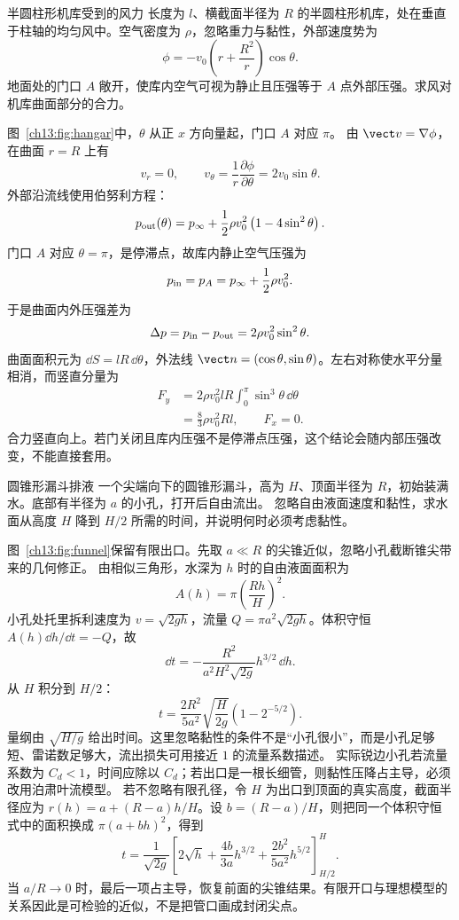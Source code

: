 \begin{origexamplebox}{半圆柱形机库受到的风力}\label{ch13:ex:hangar}
长度为 $l$、横截面半径为 $R$ 的半圆柱形机库，处在垂直于柱轴的均匀风中。空气密度为 $\rho$，忽略重力与黏性，外部速度势为
\[
 \phi=-v_0\left(r+\frac{R^2}{r}\right)\cos\theta .
\]
地面处的门口 $A$ 敞开，使库内空气可视为静止且压强等于 $A$ 点外部压强。求风对机库曲面部分的合力。

\FluidHangarDiagram
\end{origexamplebox}
\begin{xesolution}
图~\ref{ch13:fig:hangar}中，$\theta$ 从正 $x$ 方向量起，门口 $A$ 对应 $\pi$。
由 $\vect v=\nabla\phi$，在曲面 $r=R$ 上有
\[
 v_r=0,\qquad v_\theta=\frac1r\frac{\partial\phi}{\partial\theta}
 =2v_0\sin\theta.
\]
外部沿流线使用伯努利方程：
\[
 p_{\rm out}(\theta)=p_\infty+\frac12\rho v_0^2
 \left(1-4\sin^2\theta\right).
\]
门口 $A$ 对应 $\theta=\pi$，是停滞点，故库内静止空气压强为
\[
 p_{\rm in}=p_A=p_\infty+\frac12\rho v_0^2.
\]
于是曲面内外压强差为
\[
 \Delta p=p_{\rm in}-p_{\rm out}=2\rho v_0^2\sin^2\theta.
\]
曲面面积元为 $\dd S=lR\,\dd\theta$，外法线
$\vect n=(\cos\theta,\sin\theta)$。左右对称使水平分量相消，而竖直分量为
\begin{align*}
 F_y&=2\rho v_0^2lR\int_0^\pi\sin^3\theta\,\dd\theta\\
 &=\boxed{\frac83\rho v_0^2Rl},\qquad F_x=0.
\end{align*}
合力竖直向上。若门关闭且库内压强不是停滞点压强，这个结论会随内部压强改变，不能直接套用。
\end{xesolution}

\begin{origexamplebox}{圆锥形漏斗排液}\label{ch13:ex:funnel}
一个尖端向下的圆锥形漏斗，高为 $H$、顶面半径为 $R$，初始装满水。底部有半径为 $a$ 的小孔，打开后自由流出。
忽略自由液面速度和黏性，求水面从高度 $H$ 降到 $H/2$ 所需的时间，并说明何时必须考虑黏性。

\FluidFunnelDiagram
\end{origexamplebox}
\begin{xesolution}
图~\ref{ch13:fig:funnel}保留有限出口。先取 $a\ll R$ 的尖锥近似，忽略小孔截断锥尖带来的几何修正。
由相似三角形，水深为 $h$ 时的自由液面面积为
\[
 A(h)=\pi\left(\frac{Rh}{H}\right)^2.
\]
小孔处托里拆利速度为 $v=\sqrt{2gh}$，流量
$Q=\pi a^2\sqrt{2gh}$。体积守恒 $A(h)\dd h/\dd t=-Q$，故
\[
 \dd t=-\frac{R^2}{a^2H^2\sqrt{2g}}h^{3/2}\,\dd h.
\]
从 $H$ 积分到 $H/2$：
\[
 \boxed{t=\frac{2R^2}{5a^2}\sqrt{\frac{H}{2g}}
 \left(1-2^{-5/2}\right)}.
\]
量纲由 $\sqrt{H/g}$ 给出时间。这里忽略黏性的条件不是“小孔很小”，而是小孔足够短、雷诺数足够大，流出损失可用接近 $1$ 的流量系数描述。
实际锐边小孔若流量系数为 $C_d<1$，时间应除以 $C_d$；若出口是一根长细管，则黏性压降占主导，必须改用泊肃叶流模型。
若不忽略有限孔径，令 $H$ 为出口到顶面的真实高度，截面半径应为
$r(h)=a+(R-a)h/H$。设 $b=(R-a)/H$，则把同一个体积守恒式中的面积换成 $\pi(a+bh)^2$，得到
\[
 t=\frac1{\sqrt{2g}}\left[
 2\sqrt h+\frac{4b}{3a}h^{3/2}+\frac{2b^2}{5a^2}h^{5/2}
 \right]_{H/2}^{H}.
\]
当 $a/R\to0$ 时，最后一项占主导，恢复前面的尖锥结果。有限开口与理想模型的关系因此是可检验的近似，不是把管口画成封闭尖点。
\end{xesolution}

